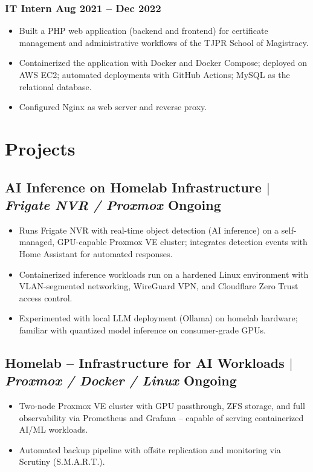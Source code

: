 \documentclass[10.5pt]{article}
\begin{document}
\subsubsection{IT Intern \hfill Aug 2021 -- Dec 2022}
\begin{itemize}
    \item Built a PHP web application (backend and frontend) for certificate management and
          administrative workflows of the TJPR School of Magistracy.
    \item Containerized the application with Docker and Docker Compose; deployed on AWS EC2;
          automated deployments with GitHub Actions; MySQL as the relational database.
    \item Configured Nginx as web server and reverse proxy.
\end{itemize}

\section{Projects}
\subsection{AI Inference on Homelab Infrastructure $|$ \normalfont\textit{Frigate NVR / Proxmox} \hfill Ongoing}
\begin{itemize}
    \item Runs Frigate NVR with real-time object detection (AI inference) on a self-managed, GPU-capable
          Proxmox VE cluster; integrates detection events with Home Assistant for automated responses.
    \item Containerized inference workloads run on a hardened Linux environment with VLAN-segmented
          networking, WireGuard VPN, and Cloudflare Zero Trust access control.
    \item Experimented with local LLM deployment (Ollama) on homelab hardware; familiar with
          quantized model inference on consumer-grade GPUs.
\end{itemize}
\subsection{Homelab -- Infrastructure for AI Workloads $|$ \normalfont\textit{Proxmox / Docker / Linux} \hfill Ongoing}
\begin{itemize}
    \item Two-node Proxmox VE cluster with GPU passthrough, ZFS storage, and full observability
          via Prometheus and Grafana -- capable of serving containerized AI/ML workloads.
    \item Automated backup pipeline with offsite replication and monitoring via Scrutiny (S.M.A.R.T.).
\end{itemize}
\end{document}

